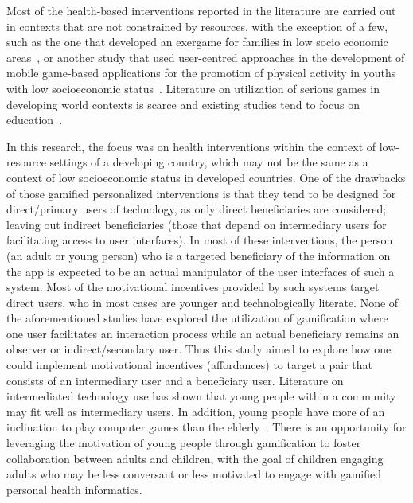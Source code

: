 Most of the health-based interventions reported in the literature are carried out in contexts that are not constrained by resources, with the exception of a few, such as the one that developed an exergame for families in low socio economic areas~\citep{saksono2015spaceship}, or another study that used user-centred approaches in the development of mobile game-based applications for the promotion of physical activity in youths with low socioeconomic status~\citep{blackman2016developing}. Literature on utilization of serious games in developing world contexts is scarce and existing studies tend to focus on education~\citep{kam2008designing,botha2015icts}.

In this research, the focus was on health interventions within the context of low-resource settings of a developing country, which may not be the same as a context of low socioeconomic status in developed countries. One of the drawbacks of those gamified personalized interventions is that they tend to be designed for direct/primary users of technology, as only direct beneficiaries are considered; leaving out indirect beneficiaries (those that depend on intermediary users for facilitating access to user interfaces). In most of these interventions, the person (an adult or young person) who is a targeted beneficiary of the information on the app is expected to be an actual manipulator of the user interfaces of such a system. Most of the motivational incentives provided by such systems target direct users, who in most cases are younger and technologically literate. None of the aforementioned studies have explored the utilization of gamification where one user facilitates an interaction process while an actual beneficiary remains an observer or indirect/secondary user. Thus this study aimed to explore how one could implement motivational incentives (affordances) to target a pair that consists of an intermediary user and a beneficiary user. Literature on intermediated technology use has shown that young people within a community may fit well as intermediary users. In addition, young people have more of an inclination to play computer games than the elderly~\citep{brauner2013increase}. There is an opportunity for leveraging the  motivation of young people through gamification to foster collaboration between adults and children, with the goal of children engaging adults who may be less conversant or less motivated to engage with gamified personal health informatics. 

\begin{flushright}
\end{flushright}
